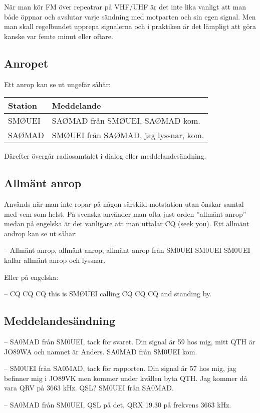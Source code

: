 När man kör FM över repeatrar på VHF/UHF är det inte lika vanligt att man både
öppnar och avslutar varje sändning med motparten och sin egen signal. Men man
skall regelbundet upprepa signalerna och i praktiken är det lämpligt att göra
kanske var femte minut eller oftare.

\subsection{Anropet}

Ett anrop kan se ut ungefär såhär:

\begin{tabular}{ll}
	Station & Meddelande                            \\ \hline
	SMØUEI  & SAØMAD från SMØUEI, SAØMAD kom.       \\
	SAØMAD  & SMØUEI från SAØMAD, jag lyssnar, kom.
\end{tabular}

Därefter övergår radiosamtalet i dialog eller meddelandesändning.

\subsection{Allmänt anrop}

Används när man inte ropar på någon särskild motstation utan önskar samtal med
vem som helst. På svenska använder man ofta just orden ''allmänt anrop'' medan
på engelska är det vanligare att man uttalar CQ (seek you). Ett allmänt androp
kan se ut såhär:

-- Allmänt anrop, allmänt anrop, allmänt anrop från SM0UEI SM0UEI SM0UEI kallar
allmänt anrop och lyssnar.

Eller på engelska:

-- CQ CQ CQ this is SMØUEI calling CQ CQ CQ and standing by.

\subsection{Meddelandesändning}

-- SA0MAD från SM0UEI, tack för svaret. Din signal är 59 hos mig, mitt QTH är
JO89WA och namnet är Anders. SA0MAD från SM0UEI kom.

-- SM0UEI från SA0MAD, tack för rapporten. Din signal är 57 hos mig, jag
befinner mig i JO89VK men kommer under kvällen byta QTH. Jag kommer då vara QRV
på 3663 kHz. QSL? SM0UEI från SA0MAD.

-- SA0MAD från SM0UEI, QSL på det, QRX 19.30 på frekvens 3663 kHz.

